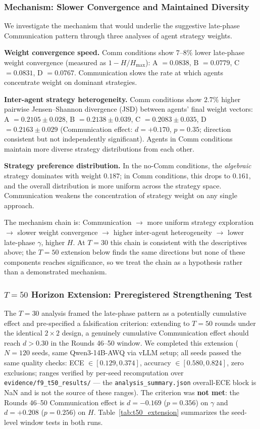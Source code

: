 \documentclass[11pt]{article}
\theoremstyle{definition}
\theoremstyle{remark}
\begin{document}
\subsubsection{Mechanism: Slower Convergence and Maintained Diversity}

We investigate the mechanism that would underlie the suggestive late-phase Communication pattern through three analyses of agent strategy weights.

\textbf{Weight convergence speed.} Comm conditions show $7$--$8\%$ lower late-phase weight convergence (measured as $1 - H/H_{\max}$): A $=0.0838$, B $=0.0779$, C $=0.0831$, D $=0.0767$. Communication slows the rate at which agents concentrate weight on dominant strategies.

\textbf{Inter-agent strategy heterogeneity.} Comm conditions show $2.7\%$ higher pairwise Jensen--Shannon divergence (JSD) between agents' final weight vectors: A $=0.2105 \pm 0.028$, B $=0.2138 \pm 0.039$, C $=0.2083 \pm 0.035$, D $=0.2163 \pm 0.029$ (Communication effect: $d{=}+0.170$, $p{=}0.35$; direction consistent but not independently significant). Agents in Comm conditions maintain more diverse strategy distributions from each other.

\textbf{Strategy preference distribution.} In the no-Comm conditions, the \textit{algebraic} strategy dominates with weight $0.187$; in Comm conditions, this drops to $0.161$, and the overall distribution is more uniform across the strategy space. Communication weakens the concentration of strategy weight on any single approach.

The mechanism chain is: Communication $\rightarrow$ more uniform strategy exploration $\rightarrow$ slower weight convergence $\rightarrow$ higher inter-agent heterogeneity $\rightarrow$ lower late-phase $\gamma$, higher $H$. At $T{=}30$ this chain is consistent with the descriptives above; the $T{=}50$ extension below finds the same directions but none of these components reaches significance, so we treat the chain as a hypothesis rather than a demonstrated mechanism.

\subsubsection{$T{=}50$ Horizon Extension: Preregistered Strengthening Test}

The $T{=}30$ analysis framed the late-phase pattern as a potentially cumulative effect and pre-specified a falsification criterion: extending to $T{=}50$ rounds under the identical $2 \times 2$ design, a genuinely cumulative Communication effect should reach $d > 0.30$ in the Rounds 46--50 window. We completed this extension ($N{=}120$ seeds, same Qwen3-14B-AWQ via vLLM setup; all seeds passed the same quality checks: ECE $\in [0.129, 0.374]$, accuracy $\in [0.580, 0.824]$, zero exclusions; ranges verified by per-seed recomputation over \texttt{evidence/f9\_t50\_results/} --- the \texttt{analysis\_summary.json} overall-ECE block is NaN and is not the source of these ranges). The criterion was \textbf{not met}: the Rounds 46--50 Communication effect is $d{=}-0.169$ ($p{=}0.356$) on $\gamma$ and $d{=}+0.208$ ($p{=}0.256$) on $H$. Table~\ref{tab:t50_extension} summarizes the seed-level window tests in both runs.
\end{document}
